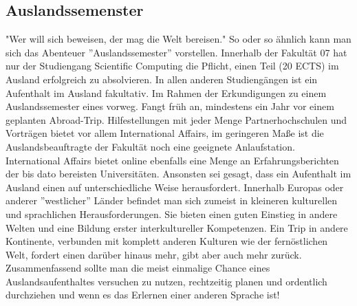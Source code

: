 \subsection{Auslandssemenster}
"Wer will sich beweisen, der mag die Welt bereisen."\doublebreak
So oder so ähnlich kann man sich das Abenteuer ''Auslandssemester'' 
vorstellen. Innerhalb der Fakultät 07 hat nur der Studiengang Scientific 
Computing die Pflicht, einen Teil (20 ECTS) im Ausland erfolgreich zu 
absolvieren. In allen anderen Studiengängen ist ein Aufenthalt im 
Ausland fakultativ. \doublebreak
Im Rahmen der Erkundigungen zu einem Auslandssemester eines 
vorweg. Fangt früh an, mindestens ein Jahr vor einem geplanten 
Abroad-Trip. Hilfestellungen mit jeder Menge Partnerhochschulen 
und Vorträgen bietet vor allem International Affairs, im geringeren 
Maße ist die Auslandsbeauftragte der Fakultät noch eine geeignete 
Anlaufstation. International Affairs bietet online ebenfalls eine Menge 
an Erfahrungsberichten der bis dato bereisten Universitäten.\doublebreak 
Ansonsten sei gesagt, dass ein Aufenthalt im Ausland einen auf 
unterschiedliche Weise herausfordert. Innerhalb Europas oder anderer 
''westlicher'' Länder befindet man sich zumeist in kleineren kulturellen 
und sprachlichen Herausforderungen. \doublebreak
Sie bieten einen guten Einstieg in andere Welten und eine Bildung 
erster interkultureller Kompetenzen. Ein Trip in andere Kontinente, 
verbunden mit komplett anderen Kulturen wie der fernöstlichen Welt, 
fordert einen darüber hinaus mehr, gibt aber auch mehr zurück.\doublebreak 
Zusammenfassend sollte man die meist einmalige Chance eines 
Auslandsaufenthaltes versuchen zu nutzen, rechtzeitig planen und 
ordentlich durchziehen und wenn es das Erlernen einer anderen 
Sprache ist! 